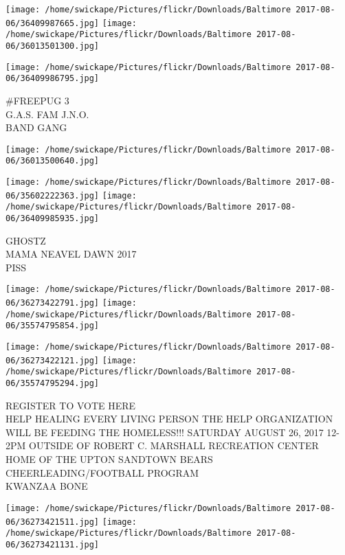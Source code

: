 \documentclass[10pt,letterpaper]{article}
\begin{document}
\texttt{[image: /home/swickape/Pictures/flickr/Downloads/Baltimore 2017-08-06/36409987665.jpg]}
\texttt{[image: /home/swickape/Pictures/flickr/Downloads/Baltimore 2017-08-06/36013501300.jpg]}

\texttt{[image: /home/swickape/Pictures/flickr/Downloads/Baltimore 2017-08-06/36409986795.jpg]}

\#FREEPUG 3\\
G.A.S. FAM J.N.O.\\
BAND GANG\\
\pagebreak

\texttt{[image: /home/swickape/Pictures/flickr/Downloads/Baltimore 2017-08-06/36013500640.jpg]}

\vspace{0.25in}
\texttt{[image: /home/swickape/Pictures/flickr/Downloads/Baltimore 2017-08-06/35602222363.jpg]}
\texttt{[image: /home/swickape/Pictures/flickr/Downloads/Baltimore 2017-08-06/36409985935.jpg]}

GHOSTZ\\
MAMA NEAVEL DAWN 2017\\
PISS\\
\pagebreak

\texttt{[image: /home/swickape/Pictures/flickr/Downloads/Baltimore 2017-08-06/36273422791.jpg]}
\texttt{[image: /home/swickape/Pictures/flickr/Downloads/Baltimore 2017-08-06/35574795854.jpg]}

\texttt{[image: /home/swickape/Pictures/flickr/Downloads/Baltimore 2017-08-06/36273422121.jpg]}
\texttt{[image: /home/swickape/Pictures/flickr/Downloads/Baltimore 2017-08-06/35574795294.jpg]}

REGISTER TO VOTE HERE\\
HELP HEALING EVERY LIVING PERSON THE HELP ORGANIZATION WILL BE FEEDING THE HOMELESS!!! SATURDAY AUGUST 26, 2017 12{-}2PM OUTSIDE OF ROBERT C. MARSHALL RECREATION CENTER\\
HOME OF THE UPTON SANDTOWN BEARS CHEERLEADING/FOOTBALL PROGRAM\\
KWANZAA BONE\\
\pagebreak

\texttt{[image: /home/swickape/Pictures/flickr/Downloads/Baltimore 2017-08-06/36273421511.jpg]}
\texttt{[image: /home/swickape/Pictures/flickr/Downloads/Baltimore 2017-08-06/36273421131.jpg]}
\end{document}
